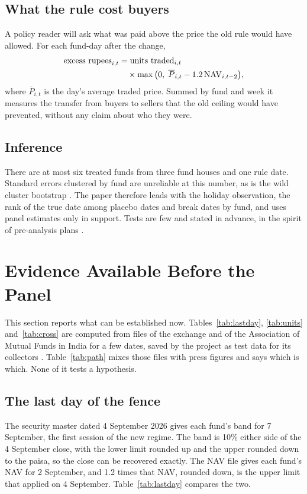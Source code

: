 \subsection{What the rule cost buyers}
A policy reader will ask what was paid above the price the old rule would have allowed. For each fund-day after the change,
\begin{equation}\label{eq:excess}
\begin{split}\text{excess rupees}_{i,t}&=\text{units traded}_{i,t}\\&\quad\times\max\big(0,\;\overline{P}_{i,t}-1.2\,\mathrm{NAV}_{i,t-2}\big),\end{split}
\end{equation}
where $\overline{P}_{i,t}$ is the day's average traded price. Summed by fund and week it measures the transfer from buyers to sellers that the old ceiling would have prevented, without any claim about who they were.

\subsection{Inference}
There are at most six treated funds from three fund houses and one rule date. Standard errors clustered by fund are unreliable at this number, as is the wild cluster bootstrap \citep{mackinnon2018wild}. The paper therefore leads with the holiday observation, the rank of the true date among placebo dates and break dates by fund, and uses panel estimates only in support. Tests are few and stated in advance, in the spirit of pre-analysis plans \citep{olken2015promises,harvey2017presidential}.

\section{Evidence Available Before the Panel}\label{sec:evidence}
This section reports what can be established now. Tables~\ref{tab:lastday}, \ref{tab:units} and~\ref{tab:cross} are computed from files of the exchange and of the Association of Mutual Funds in India for a few dates, saved by the project as test data for its collectors \citep{nse2026files,amfi2026nav}. Table~\ref{tab:path} mixes those files with press figures and says which is which. None of it tests a hypothesis.

\subsection{The last day of the fence}
The security master dated 4 September 2026 gives each fund's band for 7 September, the first session of the new regime. The band is 10\% either side of the 4 September close, with the lower limit rounded up and the upper rounded down to the paisa, so the close can be recovered exactly. The NAV file gives each fund's NAV for 2 September, and 1.2 times that NAV, rounded down, is the upper limit that applied on 4 September. Table~\ref{tab:lastday} compares the two.

